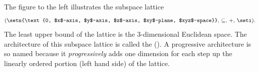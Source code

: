 \begin{minipage}[c]{\tw/2}
  \begin{example}
  \label{ex:lat_E3d_progressive}
  The figure to the left illustrates the subspace lattice
  \[ (\setn{\text{0, $x$-axis, $y$-axis, $z$-axis, $xy$-plane, $xyz$-space}},\, \subseteq,\, +,\, \seti). \]
  The least upper bound of the lattice is the 3-dimensional Euclidean space.
  The architecture of this subspace lattice is called the 
  ().
  A progressive architecture is so named because it {\em progressively} adds
  one dimension for each step up the linearly ordered portion
  (left hand side) of the lattice.
\end{example}
\end{minipage}

